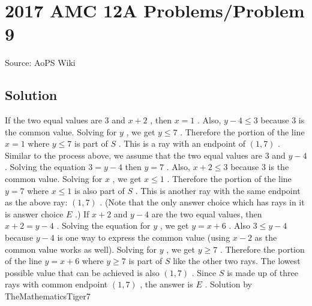 \documentclass[12pt]{article}
\begin{document}
\section*{{2017 AMC 12A Problems/Problem 9}}
Source: AoPS Wiki

\subsection*{Solution}
If the two equal values are $3$ and $x+2$ , then $x=1$ . Also, $y-4\leqslant 3$ because $3$ is the common value. Solving for $y$ , we get $y\leqslant 7$ . Therefore the portion of the line $x=1$ where $y\leqslant 7$ is part of $S$ . This is a ray with an endpoint of $(1, 7)$ . Similar to the process above, we assume that the two equal values are $3$ and $y-4$ . Solving the equation $3=y-4$ then $y=7$ . Also, $x+2\leqslant 3$ because $3$ is the common value. Solving for $x$ , we get $x\leqslant 1$ . Therefore the portion of the line $y=7$ where $x\leqslant 1$ is also part of $S$ . This is another ray with the same endpoint as the above ray: $(1, 7)$ . (Note that the only answer choice which has rays in it is answer choice $E$ .) If $x+2$ and $y-4$ are the two equal values, then $x+2=y-4$ . Solving the equation for $y$ , we get $y=x+6$ . Also $3\leqslant y-4$ because $y-4$ is one way to express the common value (using $x-2$ as the common value works as well). Solving for $y$ , we get $y\geqslant 7$ . Therefore the portion of the line $y=x+6$ where $y\geqslant 7$ is part of $S$ like the other two rays. The lowest possible value that can be achieved is also $(1, 7)$ . Since $S$ is made up of three rays with common endpoint $(1, 7)$ , the answer is $\boxed{E}$ . Solution by TheMathematicsTiger7
\end{document}
